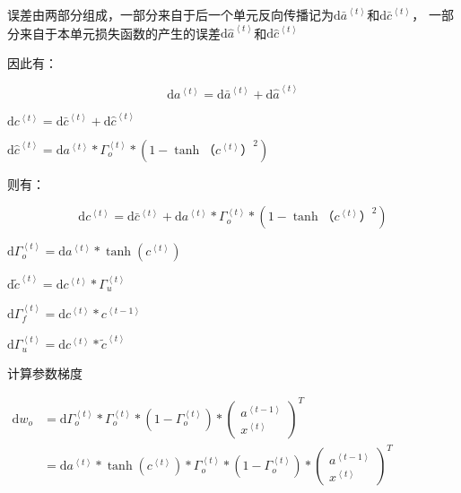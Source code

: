 \documentclass[
]{article}
\author{}
\date{}
\begin{document}
误差由两部分组成，一部分来自于后一个单元反向传播记为\(\mathrm{d}\bar{a}^{\left\langle t\right\rangle}\)和\(\mathrm{d}\bar{c}^{\left\langle t\right\rangle}\)，
一部分来自于本单元损失函数的产生的误差\(\mathrm{d}\hat{a}^{\left\langle t\right\rangle}\)和\(\mathrm{d}\hat{c}^{\left\langle t\right\rangle}\)

因此有：

\[\mathrm{d}{a}^{\left\langle t\right\rangle}=\mathrm{d}\bar{a}^{\left\langle t\right\rangle}+\mathrm{d}\hat{a}^{\left\langle t\right\rangle}\]

\(\mathrm{d}{c}^{\left\langle t\right\rangle}=\mathrm{d}\bar{c}^{\left\langle t\right\rangle}+\mathrm{d}\hat{c}^{\left\langle t\right\rangle}\)

\(\mathrm{d}\hat{c}^{\left\langle t\right\rangle}=\mathrm{d}a^{\left\langle t\right\rangle}*\Gamma_{o}^{\left\langle t\right\rangle}*(1-\tanh（c^{\left\langle t\right\rangle}）^2)\)

则有：

\[\mathrm{d}{c}^{\left\langle t\right\rangle}=\mathrm{d}\bar{c}^{\left\langle t\right\rangle}+\mathrm{d}a^{\left\langle t\right\rangle}*\Gamma_{o}^{\left\langle t\right\rangle}*(1-\tanh（c^{\left\langle t\right\rangle}）^2)\]

\(\mathrm{d}\Gamma_{o}^{\left\langle t\right\rangle} = \mathrm{d}a^{\left\langle t\right\rangle}* \tanh(c^{\left\langle t\right\rangle})\)

\(\mathrm{d}\tilde{c}^{\left\langle t\right\rangle}=\mathrm{d}c^{\left\langle t\right\rangle}*\Gamma_{u}^{\left\langle t\right\rangle}\)

\(\mathrm{d}\Gamma_{f}^{\left\langle t\right\rangle} = \mathrm{d}c^{\left\langle t\right\rangle}*c^{\left\langle t-1\right\rangle}\)

\(\mathrm{d}\Gamma_{u}^{\left\langle t\right\rangle} = \mathrm{d}c^{\left\langle t\right\rangle}*\tilde{c}^{\left\langle t\right\rangle}\)

计算参数梯度

\(\begin{aligned}\mathrm{d}w_o &=\mathrm{d}\Gamma_{o}^{\left\langle t\right\rangle}*\Gamma_{o}^{\left\langle t\right\rangle}*(1-\Gamma_{o}^{\left\langle t\right\rangle})* \left(\begin{array} {c}a^{\left \langle t-1\right\rangle} \\x^{\left \langle t\right\rangle}\end{array}\right)^T\\ &=\mathrm{d}a^{\left\langle t\right\rangle}* \tanh(c^{\left\langle t\right\rangle})*\Gamma_{o}^{\left\langle t\right\rangle}*(1-\Gamma_{o}^{\left\langle t\right\rangle})* \left(\begin{array} {c}a^{\left \langle t-1\right\rangle} \\x^{\left \langle t\right\rangle}\end{array}\right)^T\end{aligned}\)
\end{document}
